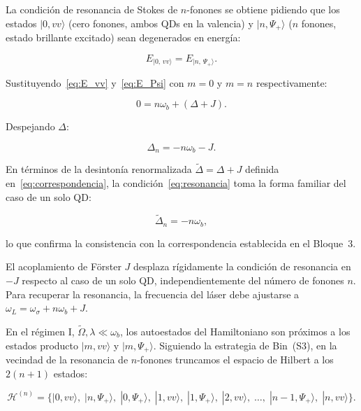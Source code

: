 \documentclass[12pt]{article}
\begin{document}
	\medskip
	\noindent
	La condici\'on de resonancia de Stokes de $n$-fonones se obtiene pidiendo que
	los estados $|0, vv\rangle$ (cero fonones, ambos QDs en la valencia) y
	$|n, \Psi_+\rangle$ ($n$ fonones, estado brillante excitado) sean
	degenerados en energ\'ia:
	
	\begin{equation}
		E_{|0,\, vv\rangle} = E_{|n,\, \Psi_+\rangle}.
	\end{equation}
	
	\noindent
	Sustituyendo~\eqref{eq:E_vv} y~\eqref{eq:E_Psi} con $m = 0$ y $m = n$
	respectivamente:
	
	\begin{equation}
		0 = n\omega_b + (\Delta + J).
	\end{equation}
	
	\noindent
	Despejando $\Delta$:
	
	\begin{equation}
		\boxed{
			\Delta_n = -n\omega_b - J.
		}
		\label{eq:resonancia}
	\end{equation}
	
	\noindent
	En t\'erminos de la desinton\'ia renormalizada $\widetilde{\Delta} = \Delta + J$
	definida en~\eqref{eq:correspondencia}, la condici\'on~\eqref{eq:resonancia}
	toma la forma familiar del caso de un solo QD:
	
	\begin{equation}
		\widetilde{\Delta}_n = -n\omega_b,
		\label{eq:resonancia_tilde}
	\end{equation}
	
	lo que confirma la consistencia con la correspondencia establecida en el
	Bloque~3.
	
	\medskip
	\noindent
	El acoplamiento de F\"orster $J$ desplaza r\'igidamente la condici\'on de
	resonancia en $-J$ respecto al caso de un solo QD, independientemente del
	n\'umero de fonones $n$. Para recuperar la resonancia, la frecuencia del
	l\'aser debe ajustarse a $\omega_L = \omega_\sigma + n\omega_b + J$.
	
	En el r\'egimen I, $\widetilde{\Omega}, \lambda \ll \omega_b$, los autoestados
	del Hamiltoniano son pr\'oximos a los estados producto $|m, vv\rangle$ y
	$|m, \Psi_+\rangle$. Siguiendo la estrategia de Bin~(S3), en la vecindad de
	la resonancia de $n$-fonones truncamos el espacio de Hilbert a los $2(n+1)$
	estados:
	
	\begin{equation}
		\mathcal{H}^{(n)} = \bigl\{
		|0, vv\rangle,\;
		|n, \Psi_+\rangle,\;
		|0, \Psi_+\rangle,\;
		|1, vv\rangle,\;
		|1, \Psi_+\rangle,\;
		|2, vv\rangle,\;
		\ldots,\;
		|n-1, \Psi_+\rangle,\;
		|n, vv\rangle
		\bigr\}.
		\label{eq:espacio_truncado}
	\end{equation}
	
\end{document}
